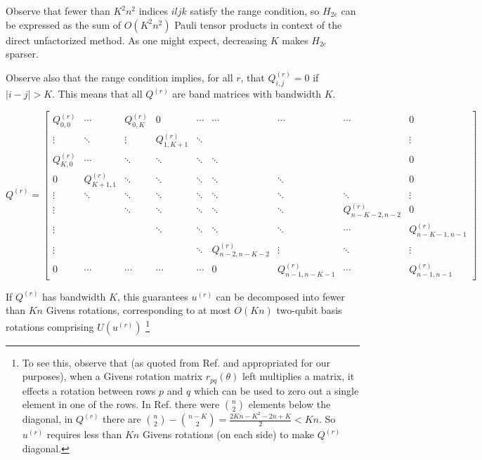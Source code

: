 Observe that fewer than $K^2n^2$ indices $iljk$ satisfy the range condition, so $H_{2e}$ can be expressed as the sum of $O(K^2n^2)$ Pauli tensor products in context of the direct unfactorized method. As one might expect, decreasing $K$ makes $H_{2e}$ sparser.

Observe also that the range condition implies, for all $r$, that $Q^{(r)}_{i, j} = 0$ if $|i - j| > K$. This means that all $Q^{(r)}$ are band matrices with bandwidth $K$.

\begin{equation}
    Q^{(r)} = \begin{bmatrix}
        Q^{(r)}_{0, 0} & \cdots & Q^{(r)}_{0, K} & 0 & \cdots & \cdots & \cdots & \cdots & 0 \\
        \vdots & \ddots & \vdots & Q^{(r)}_{1, K + 1} & \ddots & & & & \vdots \\
        Q^{(r)}_{K, 0} & \cdots & \ddots & \ddots & \ddots & \ddots & & & 0 \\
        0 & Q^{(r)}_{K + 1, 1} & \ddots & \ddots & \ddots & \ddots & \ddots & & 0 \\
        \vdots & \ddots & \ddots & \ddots & \ddots & \ddots & \ddots & \ddots & \vdots \\
        \vdots & & \ddots & \ddots & \ddots & \ddots & \ddots & Q^{(r)}_{n - K - 2, n - 2} & 0 \\
        \vdots & & & \ddots & \ddots & \ddots & \ddots & \cdots & Q^{(r)}_{n - K - 1, n - 1} \\
        \vdots & & & & \ddots & Q^{(r)}_{n - 2, n - K - 2} & \vdots & \ddots & \vdots \\
        0 & \cdots & \cdots & \cdots & \cdots & 0 & Q^{(r)}_{n - 1, n - K - 1} & \cdots & Q^{(r)}_{n - 1, n - 1}
    \end{bmatrix}
\end{equation}

If $Q^{(r)}$ has bandwidth $K$, this guarantees $u^{(r)}$ can be decomposed into fewer than $Kn$ Givens rotations, corresponding to at most $O(Kn)$ two-qubit basis rotations comprising $U(u^{(r)})$ \footnote{To see this, observe that (as quoted from Ref. \cite{FSN} and appropriated for our purposes), when a Givens rotation matrix $r_{pq}(\theta)$ left multiplies a matrix, it effects a rotation between rows $p$ and $q$ which can be used to zero out a single element in one of the rows. In Ref. \cite{FSN} there were ${n \choose 2}$ elements below the diagonal, in $Q^{(r)}$ there are ${n \choose 2} - {n - K \choose 2} = \frac{2Kn - K^2 - 2n + K}{2}< Kn$. So $u^{(r)}$ requires less than $Kn$ Givens rotations (on each side) to make $Q^{(r)}$ diagonal.}

